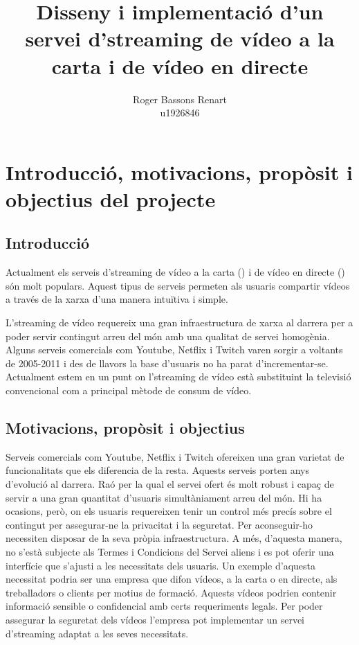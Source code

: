 \documentclass[12pt, titlepage]{article}
\begin{document}
\title{Disseny i implementació d'un servei d'streaming de vídeo a la carta i de
vídeo en directe}
\date{}
\author{Roger Bassons Renart \\
        u1926846}
\maketitle

\newpage
\thispagestyle{empty}
\mbox{}

\tableofcontents
\thispagestyle{empty}
\newpage

\section{Introducció, motivacions, propòsit i objectius del projecte}

\subsection{Introducció}

Actualment els serveis d'streaming de vídeo a la carta ()
i de vídeo en directe () són molt populars. Aquest tipus de
serveis permeten als usuaris compartir vídeos a través de la xarxa d'una manera
intuïtiva i simple.

L'streaming de vídeo requereix una gran infraestructura de xarxa al darrera per
a poder servir contingut arreu del món amb una qualitat de servei homogènia. Alguns
serveis comercials com Youtube, Netflix i Twitch varen sorgir a voltants de 2005-2011 i des
de llavors la base d'usuaris no ha parat d'incrementar-se. Actualment estem en
un punt on l'streaming de vídeo està substituint la televisió convencional com a
principal mètode de consum de vídeo.

\subsection{Motivacions, propòsit i objectius}

Serveis comercials com Youtube, Netflix i Twitch ofereixen una gran varietat de
funcionalitats que els diferencia de la resta. Aquests serveis porten anys
d'evolució al darrera. Raó per la qual el servei ofert és molt robust i capaç
de servir a una gran quantitat d'usuaris simultàniament arreu del món. Hi ha
ocasions, però, on els usuaris requereixen tenir un control més precís sobre el
contingut per assegurar-ne la privacitat i la seguretat. Per aconseguir-ho necessiten
disposar de la seva pròpia infraestructura. A més, d’aquesta manera, no s’està
subjecte als Termes i Condicions del Servei aliens i es pot oferir una interfície
que s’ajusti a les necessitats dels usuaris. Un exemple d'aquesta necessitat podria
ser una empresa que difon vídeos, a la carta o en directe, als treballadors o clients
per motius de formació. Aquests vídeos podrien contenir informació sensible o
confidencial amb certs requeriments legals. Per poder assegurar la seguretat
dels vídeos l'empresa pot implementar un servei d'streaming adaptat a les seves
necessitats.
\end{document}
